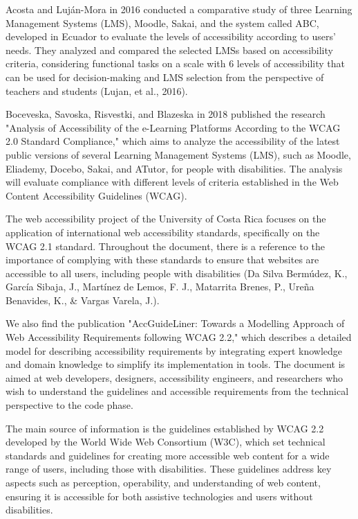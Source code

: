 \documentclass{article}
\begin{document}
Acosta and Luján-Mora in 2016 conducted a comparative study of three Learning Management Systems (LMS), Moodle, Sakai, and the system called ABC, developed in Ecuador to evaluate the levels of accessibility according to users' needs. They analyzed and compared the selected LMSs based on accessibility criteria, considering functional tasks on a scale with 6 levels of accessibility that can be used for decision-making and LMS selection from the perspective of teachers and students (Lujan, et al., 2016).

Boceveska, Savoska, Risvestki, and Blazeska in 2018 published the research "Analysis of Accessibility of the e-Learning Platforms According to the WCAG 2.0 Standard Compliance," which aims to analyze the accessibility of the latest public versions of several Learning Management Systems (LMS), such as Moodle, Eliademy, Docebo, Sakai, and ATutor, for people with disabilities. The analysis will evaluate compliance with different levels of criteria established in the Web Content Accessibility Guidelines (WCAG).

The web accessibility project of the University of Costa Rica focuses on the application of international web accessibility standards, specifically on the WCAG 2.1 standard. Throughout the document, there is a reference to the importance of complying with these standards to ensure that websites are accessible to all users, including people with disabilities (Da Silva Bermúdez, K., García Sibaja, J., Martínez de Lemos, F. J., Matarrita Brenes, P., Ureña Benavides, K., \& Vargas Varela, J.).

We also find the publication "AccGuideLiner: Towards a Modelling Approach of Web Accessibility Requirements following WCAG 2.2," which describes a detailed model for describing accessibility requirements by integrating expert knowledge and domain knowledge to simplify its implementation in tools. The document is aimed at web developers, designers, accessibility engineers, and researchers who wish to understand the guidelines and accessible requirements from the technical perspective to the code phase.

The main source of information is the guidelines established by WCAG 2.2 developed by the World Wide Web Consortium (W3C), which set technical standards and guidelines for creating more accessible web content for a wide range of users, including those with disabilities. These guidelines address key aspects such as perception, operability, and understanding of web content, ensuring it is accessible for both assistive technologies and users without disabilities.
\end{document}
